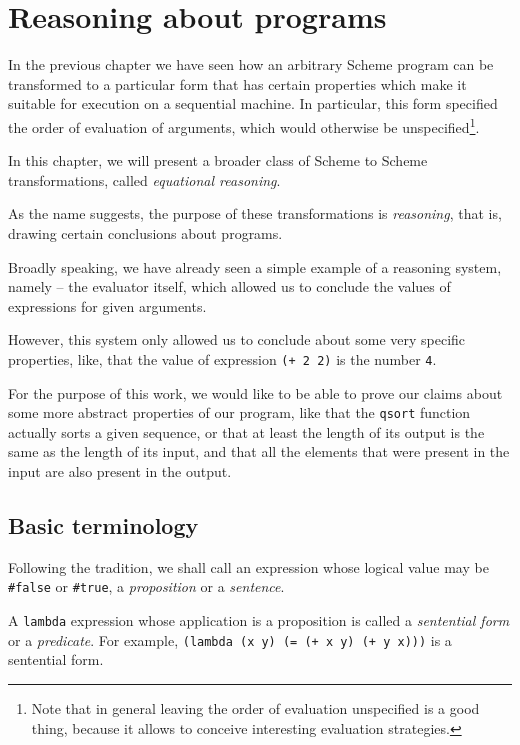\chapter{Reasoning about programs}

In the previous chapter we have seen how an arbitrary Scheme program
can be transformed to a particular form that has certain properties
which make it suitable for execution on a sequential machine. In particular,
this form specified the order of evaluation of arguments, which would
otherwise be unspecified\footnote{Note that in general leaving the
  order of evaluation unspecified is a good thing, because it allows
  to conceive interesting evaluation strategies.}.

In this chapter, we will present a broader class of Scheme to Scheme
transformations, called \textit{equational reasoning}.

As the name suggests, the purpose of these transformations is
\textit{reasoning}, that is, drawing certain conclusions about programs.

Broadly speaking, we have already seen a simple example of a reasoning system,
namely -- the evaluator itself, which allowed us to conclude the values
of expressions for given arguments.

However, this system only allowed us to conclude about some very specific
properties, like, that the value of expression \texttt{(+ 2 2)} is the
number \texttt{4}.

For the purpose of this work, we would like to be able to prove our
claims about some more abstract properties of our program, like that
the \texttt{qsort} function actually sorts a given sequence, or that
at least the length of its output is the same as the length of its
input, and that all the elements that were present in the input
are also present in the output.

\section{Basic terminology}

Following the tradition, we shall call an expression whose
logical value may be \texttt{\#false} or \texttt{\#true},
a \textit{proposition} or a \textit{sentence}.

A \texttt{lambda} expression whose application is a proposition
is called a \textit{sentential form} or a \textit{predicate}.
For example, \texttt{(lambda (x y) (= (+ x y) (+ y x)))} is
a sentential form.

